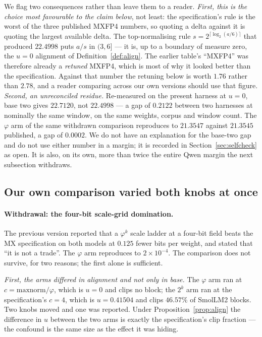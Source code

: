 \documentclass[11pt]{article}
\theoremstyle{definition}
\begin{document}
We flag two consequences rather than leave them to a reader.
\emph{First, this is the choice most favourable to the claim below},
not least: the specification's rule is the worst of the three published MXFP4
numbers, so quoting a delta against it is quoting the largest available delta.%
The top-normalising rule $s = 2^{\lceil\log_2(a/6)\rceil}$ that produced
$22.4998$ puts $a/s$ in $(3,6]$ --- it is, up to a boundary of measure zero, the
$u=0$ alignment of Definition~\ref{def:align}. The earlier table's ``MXFP4''
was therefore already a \emph{retuned} MXFP4, which is most of why it looked
better than the specification. Against that number the retuning below is worth
$1.76$ rather than $2.78$, and a reader comparing across our own versions should
use that figure.
\emph{Second, an unreconciled residue.} Re-measured on the present harness at
$u=0$, base two gives $22.7120$, not $22.4998$ --- a gap of $0.2122$ between two
harnesses at nominally the same window, on the same weights, corpus and window
count. The $\varphi$ arm of the same withdrawn comparison reproduces to
$21.3547$ against $21.3545$ published, a gap of $0.0002$. We do not have an
explanation for the base-two gap and do not use either number in a margin; it is
recorded in Section~\ref{sec:selfcheck} as open. It is also, on its own, more than
twice the entire Qwen margin the next subsection withdraws.

\subsection{Our own comparison varied both knobs at once}
\label{sec:confound}

\paragraph{Withdrawal: the four-bit scale-grid domination.}
The previous version reported that a $\varphi^{k}$ scale ladder at a four-bit
field beats the MX specification on both models at $0.125$ fewer bits per
weight, and stated that ``it is not a trade''. The $\varphi$ arm reproduces to
$2\times10^{-4}$. The comparison does not survive, for two reasons; the first
alone is sufficient.

\emph{First, the arms differed in alignment and not only in base.} The
$\varphi$ arm ran at $c=\mathrm{maxnorm}/\varphi$, which is $u=0$ and clips no
block; the $2^{k}$ arm ran at the specification's $c=4$, which is $u=0.41504$
and clips $46.57\%$ of SmolLM2 blocks. Two knobs moved and one was reported.
Under Proposition~\ref{prop:align} the difference in $u$ between the two arms is
exactly the specification's clip fraction --- the confound is the same size as
the effect it was hiding.
\end{document}
